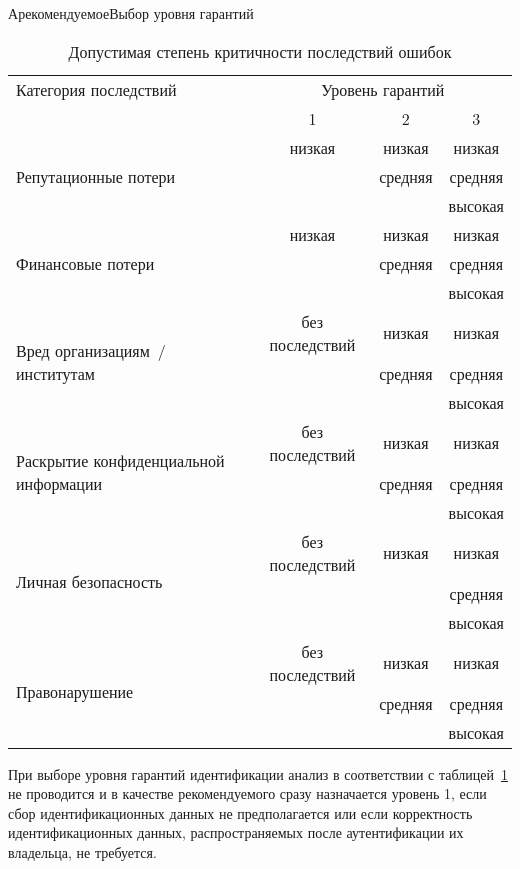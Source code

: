 \begin{appendix}{А}{рекомендуемое}{Выбор уровня гарантий}
\begin{table}[hbt]
\caption{Допустимая степень критичности последствий ошибок}
\label{Table.AL.Levels}
{\small
\begin{tabular}{|l|c|c|c|}
\hline
Категория последствий & \multicolumn{3}{|c|}{Уровень гарантий}\\
\cline{2-4}
& 1 & 2 & 3\\
\hline
\hline
\multirow{3}{*}{Репутационные потери}
& низкая & низкая  & низкая\\
&       & средняя & средняя\\
&       &         & высокая\\
%
\hline
\multirow{3}{*}{Финансовые потери}
& низкая & низкая  & низкая\\
&        & средняя & средняя\\
&        &         & высокая\\
%
\hline
\multirow{3}{*}{Вред организациям~/ институтам}
& без последствий & низкая  & низкая\\ 
&                 & средняя & средняя\\ 
&                 &         & высокая\\ 
%
\hline
\multirow{3}{*}{Раскрытие конфиденциальной информации}
& без последствий & низкая  & низкая\\ 
&                 & средняя & средняя\\ 
&                 &         & высокая\\ 
%
\hline
\multirow{3}{*}{Личная безопасность}
& без последствий & низкая & низкая\\ 
&                 &        & средняя\\ 
&                 &        & высокая\\ 
%
\hline
\multirow{3}{*}{Правонарушение}
& без последствий & низкая  & низкая\\ 
&                 & средняя & средняя\\ 
&                 &         & высокая\\ 
\hline
\end{tabular}
}
\end{table}

При выборе уровня гарантий идентификации анализ в соответствии с 
таблицей~\ref{Table.AL.Levels} не проводится и в качестве рекомендуемого 
сразу назначается уровень 1, если сбор идентификационных данных не 
предполагается или если корректность идентификационных данных, распространяемых 
после аутентификации их владельца, не требуется.


\end{appendix}
